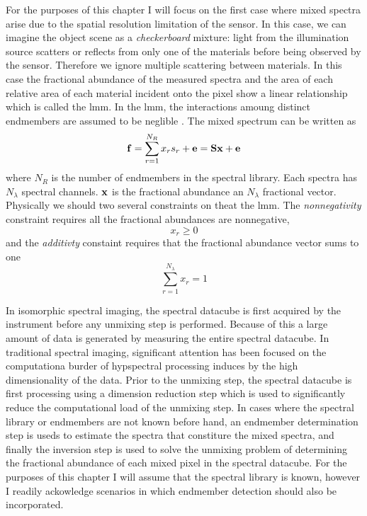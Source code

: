 For the purposes of this chapter I will focus on the first case where mixed spectra arise due to the spatial resolution limitation of the sensor. In this case, we can imagine the object scene as a \emph{checkerboard} mixture: light from the illumination source scatters or reflects from only one of the materials before being observed by the sensor. Therefore we ignore multiple scattering between materials. In this case the fractional abundance of the measured spectra and the area of each relative area of each material incident onto the pixel show a linear relationship which is called the \gls{lmm}. In the \gls{lmm}, the interactions amoung distinct endmembers are assumed to be neglible \cite{clark1984reflectance}. The mixed spectrum can be written as
%
\begin{equation}
\mathbf{f} = \sum_{r=1}^{N_{R}} x_r s_r + \mathbf{e} = \mathbf{S} \mathbf{x}  + \mathbf{e}
\end{equation}
%
where $N_R$ is the number of endmembers in the spectral library. Each spectra has $N_{\lambda}$ spectral channels. $\mathbf{x}$ is the \gls{fractional abundance} an $N_{\lambda}$ fractional vector. Physically we should two several constraints on theat the \gls{lmm}. The \emph{nonnegativity} constraint requires all the fractional abundances are nonnegative, 
%
\begin{equation}
	x_r \geq 0
\end{equation}
%
and the \emph{additivty} constaint requires that the fractional abundance vector sums to one
%
\begin{equation}
	\sum_{r = 1}^{N_{\lambda}} x_r = 1
\end{equation}


In isomorphic spectral imaging, the spectral datacube is first acquired by the instrument before any unmixing step is performed. Because of this a large amount of data is generated by measuring the entire spectral datacube. In traditional spectral imaging, significant attention has been focused on the computationa burder of hypspectral processing induces by the high dimensionality of the data. Prior to the unmixing step, the spectral datacube is first processing using a \gls{dimension reduction} step which is used to significantly reduce the computational load of the unmixing step. In cases where the spectral library or endmembers are not known before hand, an \gls{endmember determination} step is useds to estimate the spectra that constiture the mixed spectra, and finally the \gls{inversion} step is used to solve the unmixing problem of determining the \gls{fractional abundance} of each mixed pixel in the spectral datacube. For the purposes of this chapter I will assume that the spectral library is known, however I readily ackowledge scenarios in which endmember detection should also be incorporated. 


